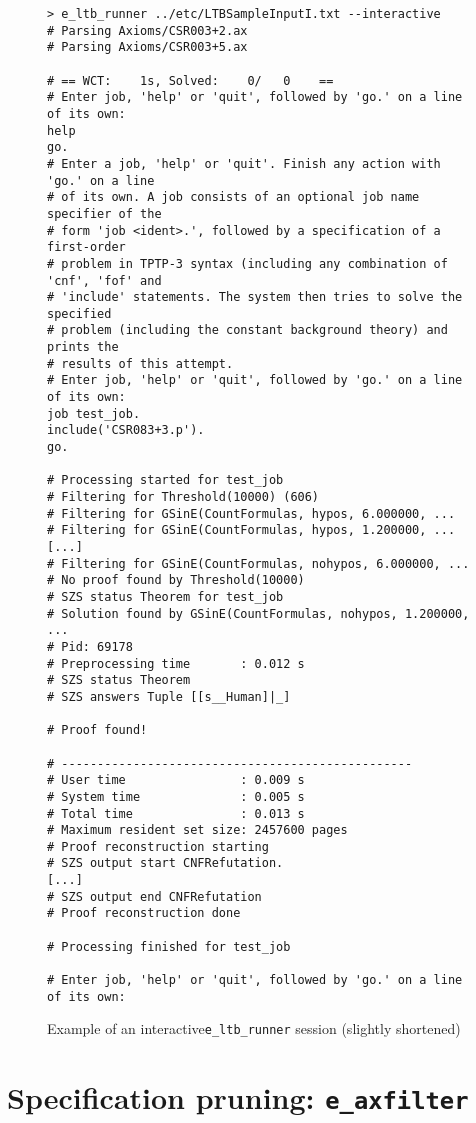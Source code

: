 \documentclass{report}
\begin{document}
\begin{figure}
  \centering
  \footnotesize
\begin{verbatim}
> e_ltb_runner ../etc/LTBSampleInputI.txt --interactive
# Parsing Axioms/CSR003+2.ax
# Parsing Axioms/CSR003+5.ax

# == WCT:    1s, Solved:    0/   0    ==
# Enter job, 'help' or 'quit', followed by 'go.' on a line of its own:
help
go.
# Enter a job, 'help' or 'quit'. Finish any action with 'go.' on a line
# of its own. A job consists of an optional job name specifier of the
# form 'job <ident>.', followed by a specification of a first-order
# problem in TPTP-3 syntax (including any combination of 'cnf', 'fof' and
# 'include' statements. The system then tries to solve the specified
# problem (including the constant background theory) and prints the
# results of this attempt.
# Enter job, 'help' or 'quit', followed by 'go.' on a line of its own:
job test_job.
include('CSR083+3.p').
go.

# Processing started for test_job
# Filtering for Threshold(10000) (606)
# Filtering for GSinE(CountFormulas, hypos, 6.000000, ...
# Filtering for GSinE(CountFormulas, hypos, 1.200000, ...
[...]
# Filtering for GSinE(CountFormulas, nohypos, 6.000000, ...
# No proof found by Threshold(10000)
# SZS status Theorem for test_job
# Solution found by GSinE(CountFormulas, nohypos, 1.200000, ...
# Pid: 69178
# Preprocessing time       : 0.012 s
# SZS status Theorem
# SZS answers Tuple [[s__Human]|_]

# Proof found!

# -------------------------------------------------
# User time                : 0.009 s
# System time              : 0.005 s
# Total time               : 0.013 s
# Maximum resident set size: 2457600 pages
# Proof reconstruction starting
# SZS output start CNFRefutation.
[...]
# SZS output end CNFRefutation
# Proof reconstruction done

# Processing finished for test_job

# Enter job, 'help' or 'quit', followed by 'go.' on a line of its own:
\end{verbatim}
  \caption{Example of an interactive\texttt{e\_ltb\_runner} session
    (slightly shortened)}
  \label{fig:lbtsession}
\end{figure}

\section{Specification pruning: \texttt{e\_axfilter}}
\end{document}
